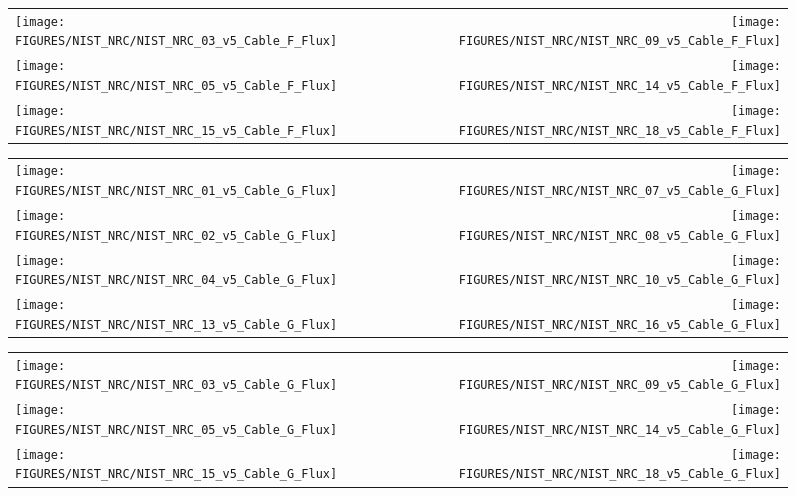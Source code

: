 \begin{figure}[p]
\begin{tabular*}{\textwidth}{l@{\extracolsep{\fill}}r}
\texttt{[image: FIGURES/NIST\_NRC/NIST\_NRC\_03\_v5\_Cable\_F\_Flux]} &
\texttt{[image: FIGURES/NIST\_NRC/NIST\_NRC\_09\_v5\_Cable\_F\_Flux]} \\
\texttt{[image: FIGURES/NIST\_NRC/NIST\_NRC\_05\_v5\_Cable\_F\_Flux]} &
\texttt{[image: FIGURES/NIST\_NRC/NIST\_NRC\_14\_v5\_Cable\_F\_Flux]} \\
\texttt{[image: FIGURES/NIST\_NRC/NIST\_NRC\_15\_v5\_Cable\_F\_Flux]} &
\texttt{[image: FIGURES/NIST\_NRC/NIST\_NRC\_18\_v5\_Cable\_F\_Flux]}
\end{tabular*}
\label{NIST_NRC_Cable_F_Flux_Open}
\end{figure}

\begin{figure}[p]
\begin{tabular*}{\textwidth}{l@{\extracolsep{\fill}}r}
\texttt{[image: FIGURES/NIST\_NRC/NIST\_NRC\_01\_v5\_Cable\_G\_Flux]} &
\texttt{[image: FIGURES/NIST\_NRC/NIST\_NRC\_07\_v5\_Cable\_G\_Flux]} \\
\texttt{[image: FIGURES/NIST\_NRC/NIST\_NRC\_02\_v5\_Cable\_G\_Flux]} &
\texttt{[image: FIGURES/NIST\_NRC/NIST\_NRC\_08\_v5\_Cable\_G\_Flux]} \\
\texttt{[image: FIGURES/NIST\_NRC/NIST\_NRC\_04\_v5\_Cable\_G\_Flux]} &
\texttt{[image: FIGURES/NIST\_NRC/NIST\_NRC\_10\_v5\_Cable\_G\_Flux]} \\
\texttt{[image: FIGURES/NIST\_NRC/NIST\_NRC\_13\_v5\_Cable\_G\_Flux]} &
\texttt{[image: FIGURES/NIST\_NRC/NIST\_NRC\_16\_v5\_Cable\_G\_Flux]}
\end{tabular*}
\label{NIST_NRC_Cable_G_Flux_Closed}
\end{figure}

\begin{figure}[p]
\begin{tabular*}{\textwidth}{l@{\extracolsep{\fill}}r}
\texttt{[image: FIGURES/NIST\_NRC/NIST\_NRC\_03\_v5\_Cable\_G\_Flux]} &
\texttt{[image: FIGURES/NIST\_NRC/NIST\_NRC\_09\_v5\_Cable\_G\_Flux]} \\
\texttt{[image: FIGURES/NIST\_NRC/NIST\_NRC\_05\_v5\_Cable\_G\_Flux]} &
\texttt{[image: FIGURES/NIST\_NRC/NIST\_NRC\_14\_v5\_Cable\_G\_Flux]} \\
\texttt{[image: FIGURES/NIST\_NRC/NIST\_NRC\_15\_v5\_Cable\_G\_Flux]} &
\texttt{[image: FIGURES/NIST\_NRC/NIST\_NRC\_18\_v5\_Cable\_G\_Flux]}
\end{tabular*}
\label{NIST_NRC_Cable_G_Flux_Open}
\end{figure}



